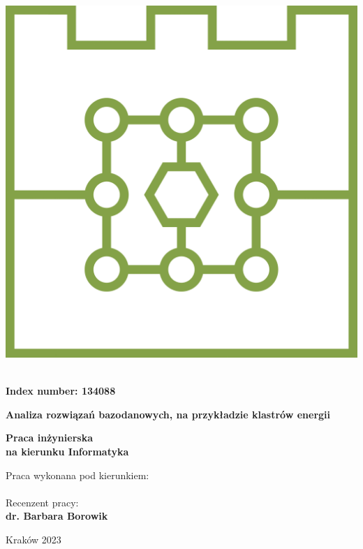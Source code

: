 \begin{titlepage}
\begin{minipage}{0.2\textwidth}
    \includegraphics[width=\linewidth]{gfx/LOGO_FACULTY} \\ 
  \end{minipage}

  \vfill
  \vfill

  \begin{center}
    \Large \textbf{\myName}\\
    \vspace{0.3cm}
    \Large \textbf{Index number: 134088}\\
  \end{center}

  \vfill

  \begin{center}
    \LARGE \textbf{Analiza rozwiązań bazodanowych, na przykładzie klastrów energii}
  \end{center} 
  
  \begin{center}
    \LARGE \textbf{\myTitle}
  \end{center} 
  
  \begin{center}
    \LARGE \textbf{Praca inżynierska\\na kierunku Informatyka}
  \end{center}
  
  \vfill
  
  \hspace{0.6\textwidth} 
  \begin{minipage}{0.4\textwidth}
  Praca wykonana pod kierunkiem: \\
  \textbf{\myProf} \\

  Recenzent pracy: \\
  \textbf{dr. Barbara Borowik}
  \end{minipage}

  \vfill
  \vfill
  
  \begin{center}
    Kraków 2023
  \end{center}

\end{titlepage}
